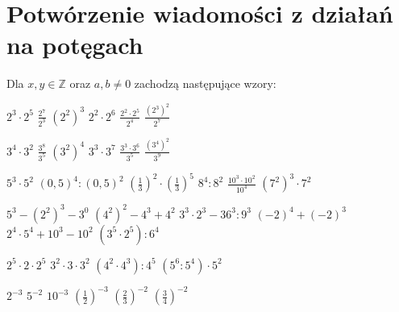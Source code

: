 \documentclass[12pt,a4paper]{article}
\begin{document}
	
	
	
	\section{Potwórzenie wiadomości z działań na potęgach}
	
	
	Dla $x,y \in \mathbb{Z}$ oraz $a,b\neq0$ zachodzą następujące wzory:
	
	
	{$2^3\cdot 2^5$}
	{$\frac{2^7}{2^3}$}
	{$(2^2)^3$}
	{$2^2\cdot 2^6$}
	{$\frac{2^2\cdot 2^5}{2^4}$}
	{$\frac{(2^3)^2}{2^7}$}
	
	{$3^4\cdot 3^2$}
	{$\frac{3^8}{3^5}$}
	{$(3^2)^4$}
	{$3^3\cdot 3^7$}
	{$\frac{3^3\cdot 3^6}{3^5}$}
	{$\frac{(3^4)^2}{3^9}$}
	
	{$5^3\cdot 5^2$}
	{$(0{,}5)^4:(0{,}5)^2$}
	{$\left(\frac{1}{3}\right)^2\cdot\left(\frac{1}{3}\right)^5$}
	{$8^4:8^2$}
	{$\frac{10^3\cdot 10^2}{10^4}$}
	{$(7^2)^3\cdot 7^2$}
	
	{$5^3-(2^2)^3-3^0$}
	{$(4^2)^2-4^3+4^2$}
	{$3^3\cdot 2^3-36^3:9^3$}
	{$(-2)^4+(-2)^3$}
	{$2^4\cdot 5^4+10^3-10^2$}
	{$(3^5\cdot 2^5):6^4$}
	
	\zadanieDomowe
	
	{$2^5\cdot 2\cdot 2^5$}
	{$3^2\cdot 3\cdot 3^2$}
	{$(4^2\cdot 4^3):4^5$}
	{$(5^6:5^4)\cdot 5^2$}
	
	\newpage {} \setcounter{zadaniaIndex}{0}
	
	{$2^{-3}$}
	{$5^{-2}$}
	{$10^{-3}$}
	{$\left(\frac{1}{2}\right)^{-3}$}
	{$\left(\frac{2}{3}\right)^{-2}$}
	{$\left(\frac{3}{4}\right)^{-2}$}
	
\end{document}
